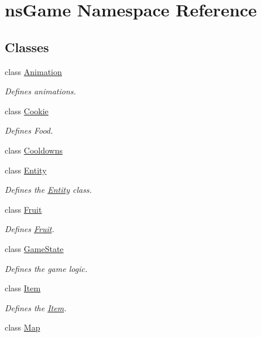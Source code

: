 \hypertarget{namespacens_game}{}\section{ns\+Game Namespace Reference}
\label{namespacens_game}
\subsection*{Classes}
\begin{DoxyCompactItemize}
\item 
class \hyperlink{classns_game_1_1_animation}{Animation}
\begin{DoxyCompactList}\small\item\em Defines animations. \end{DoxyCompactList}\item 
class \hyperlink{classns_game_1_1_cookie}{Cookie}
\begin{DoxyCompactList}\small\item\em Defines Food. \end{DoxyCompactList}\item 
class \hyperlink{classns_game_1_1_cooldowns}{Cooldowns}
\item 
class \hyperlink{structns_game_1_1_entity}{Entity}
\begin{DoxyCompactList}\small\item\em Defines the \hyperlink{structns_game_1_1_entity}{Entity} class. \end{DoxyCompactList}\item 
class \hyperlink{classns_game_1_1_fruit}{Fruit}
\begin{DoxyCompactList}\small\item\em Defines \hyperlink{classns_game_1_1_fruit}{Fruit}. \end{DoxyCompactList}\item 
class \hyperlink{classns_game_1_1_game_state}{Game\+State}
\begin{DoxyCompactList}\small\item\em Defines the game logic. \end{DoxyCompactList}\item 
class \hyperlink{structns_game_1_1_item}{Item}
\begin{DoxyCompactList}\small\item\em Defines the \hyperlink{structns_game_1_1_item}{Item}. \end{DoxyCompactList}\item 
class \hyperlink{classns_game_1_1_map}{Map}

\end{DoxyCompactItemize}
